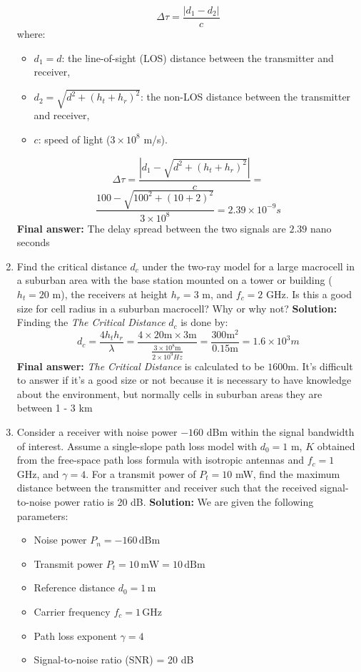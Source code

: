 \documentclass[a4paper,12pt]{book}
\begin{document}
\begin{enumerate}
		\[
		\Delta \tau = \frac{|d_1 - d_2|}{c}
		\]
		where:
		\begin{itemize}
			\item \( d_1 = d \): the line-of-sight (LOS) distance between the transmitter and receiver,
			\item \( d_2 = \sqrt{d^2 + (h_t + h_r)^2} \): the non-LOS distance between the transmitter and receiver,
			\item \( c \): speed of light (\(3 \times 10^8\) m/s).
		\end{itemize}
		
		\[
		\Delta \tau = \frac{|d_1 - \sqrt{d^2 + (h_t + h_r)^2}|}{c}=
		\]
		\[\frac{100-\sqrt{100^2+(10+2)^2}}{3\times10^8}=2.39\times10^{-9}s\]
		\textbf{Final answer:} The delay spread between the two signals are \(2.39\) nano seconds
		
		\item Find the critical distance $d_c$ under the two-ray model for a large macrocell in a suburban area with the base station mounted on a tower or building ($h_t = 20$ m), the receivers at height $h_r = 3$ m, and $f_c = 2$ GHz. Is this a good size for cell radius in a suburban macrocell? Why or why not?
		\newline\newline
		\textbf{Solution:} Finding the \textit{The Critical Distance} \(d_c\) is done by:
		\[
		d_c = \frac{4 h_t h_r}{\lambda}=\frac{4\times20\text{m}\times3\text{m}}{\frac{3\times10^8\text{m}}{2\times10^9Hz}}=\frac{300\text{m}^2}{0.15\text{m}}=1.6\times10^{3}m
		\]
		\textbf{Final answer:} \textit{The Critical Distance} is calculated to be \(1600\text{m}\). It's difficult to answer if it's a good size or not because it is necessary to have knowledge about the environment, but normally cells in suburban areas they are between 1 - 3 km
		 
		\item Consider a receiver with noise power $-160$ dBm within the signal bandwidth of interest. Assume a single-slope path loss model with $d_0 = 1$ m, $K$ obtained from the free-space path loss formula with isotropic antennas and $f_c = 1$ GHz, and $\gamma = 4$. For a transmit power of $P_t = 10$ mW, find the maximum distance between the transmitter and receiver such that the received signal-to-noise power ratio is 20 dB.
		\newline\newline\noindent
		\textbf{Solution:} We are given the following parameters:
		\begin{itemize}
			\item Noise power \( P_n = -160 \, \text{dBm} \)
			\item Transmit power \( P_t = 10 \, \text{mW} = 10 \, \text{dBm} \)
			\item Reference distance \( d_0 = 1 \, \text{m} \)
			\item Carrier frequency \( f_c = 1 \, \text{GHz} \)
			\item Path loss exponent \( \gamma = 4 \)
			\item Signal-to-noise ratio (SNR) = 20 dB
		\end{itemize}
		

\end{enumerate}
\end{document}
